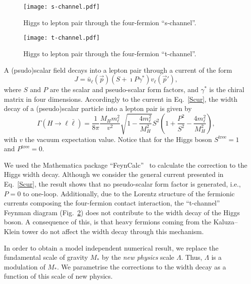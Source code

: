 \documentclass{ws-mpla}
\newcommand{\ga}{\gamma}
\renewcommand{\(}{\left(}
\renewcommand{\)}{\right)}
\renewcommand{\[}{\left[}
\renewcommand{\]}{\right]}
\begin{document}
\begin{figure}[htb]
  \begin{center}
    \texttt{[image: s-channel.pdf]}
  \end{center}
  \caption{Higgs to lepton pair through the four-fermion \mbox{``s-channel''.}}
  \label{fig:s}
\end{figure}
\begin{figure}[htb]
  \begin{center}
    \texttt{[image: t-channel.pdf]}
  \end{center}
  \caption{Higgs to lepton pair through the four-fermion \mbox{``t-channel''.}}
  \label{fig:t}
\end{figure}

A (psudo)scalar field decays into a lepton pair through a current of the form
\begin{equation}
  J = \bar{u}_\ell(\vec{p}) \( S + \imath P \ga^* \) v_\ell(\vec{p}'),
  \label{Scur}
\end{equation}
where $S$ and $P$ are the scalar and pseudo-scalar form factors, and $\ga^*$ is the chiral matrix in four dimensions. Accordingly to the current in Eq.~\eqref{Scur}, the width decay of a (pseudo)scalar particle into a lepton pair is given by 
\begin{equation}
  \Gamma(H \to \ell \bar{\ell}) = \frac{1}{8 \pi} \frac{M_H m_\ell^2}{v^2}  \sqrt{1 - \frac{4 m_\ell^2}{M_H^2} }  S^2 \( 1 + \frac{P^2}{S^2} - \frac{4 m_\ell^2}{M_H^2} \),
\end{equation}
with $v$ the vacuum expectation value. Notice that for the Higgs boson $S^{\text{tree}} = 1$ and $P^{\text{tree}} = 0$.

We used the Mathematica package ``FeynCalc''~\cite{Kublbeck:1992mt} to calculate the correction to the Higgs width decay. Although we consider the general current presented in Eq.~\eqref{Scur}, the result shows that no pseudo-scalar form factor is generated, i.e., $P = 0$ to one-loop. Additionally, due to the Lorentz structure of the fermionic currents composing the four-fermion contact interaction, the ``t-channel'' Feynman diagram (Fig.~\ref{fig:t}) does not contribute to the width decay of the Higgs boson. A consequence of this, is that heavy fermions coming from the Kaluza--Klein tower do not affect the width decay through this mechanism.

In order to obtain a model independent numerical result, we replace the fundamental scale of gravity $M_*$ by the \emph{new physics} scale $\Lambda$. Thus, $\Lambda$ is a modulation of $M_*$.
We parametrise the corrections to the width decay as a function of this scale of new physics.
\end{document}
